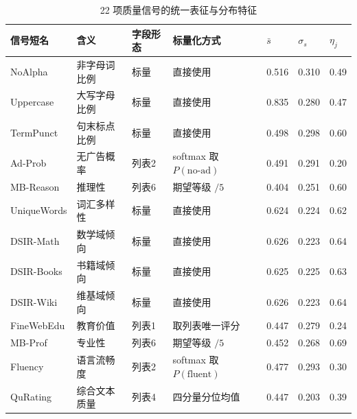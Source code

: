 \documentclass[bwprint]{gmcmthesis}
\begin{document}
\begin{table}[htbp]
    \centering
    \caption{22 项质量信号的统一表征与分布特征}
    \label{tab:q1_indicator}
    \setlength{\tabcolsep}{4pt}
    \begin{tabular}{@{}P{2.4cm} C{2.6cm} C{1.7cm} C{3cm} C{1.10cm} C{1.20cm} C{1.20cm}@{}}
        \toprule
        信号短名        & 含义      & 字段形态 & 标量化方式                                & $\bar{s}$ & $\sigma_{s}$ & $\eta_j$ \\
        \midrule
        NoAlpha     & 非字母词比例  & 标量   & 直接使用                                 & 0.516     & 0.310        & 0.49     \\
        Uppercase   & 大写字母比例  & 标量   & 直接使用                                 & 0.835     & 0.280        & 0.47     \\
        TermPunct   & 句末标点比例  & 标量   & 直接使用                                 & 0.498     & 0.298        & 0.60     \\
        Ad-Prob     & 无广告概率   & 列表2  & softmax 取 $P(\mathrm{no\text{-}ad})$ & 0.491     & 0.291        & 0.20     \\
        MB-Reason   & 推理性     & 列表6  & 期望等级 $/5$                            & 0.404     & 0.251        & 0.60     \\
        UniqueWords & 词汇多样性   & 标量   & 直接使用                                 & 0.624     & 0.224        & 0.62     \\
        DSIR-Math   & 数学域倾向   & 标量   & 直接使用                                 & 0.626     & 0.223        & 0.64     \\
        DSIR-Books  & 书籍域倾向   & 标量   & 直接使用                                 & 0.625     & 0.225        & 0.63     \\
        DSIR-Wiki   & 维基域倾向   & 标量   & 直接使用                                 & 0.626     & 0.223        & 0.64     \\
        FineWebEdu  & 教育价值    & 列表1  & 取列表唯一评分                              & 0.447     & 0.279        & 0.24     \\
        MB-Prof     & 专业性     & 列表6  & 期望等级 $/5$                            & 0.452     & 0.268        & 0.69     \\
        Fluency     & 语言流畅度   & 列表2  & softmax 取 $P(\mathrm{fluent})$       & 0.477     & 0.293        & 0.30     \\
        QuRating    & 综合文本质量  & 列表4  & 四分量分位均值                              & 0.447     & 0.203        & 0.39     \\

\end{tabular}
\end{table}
\end{document}
